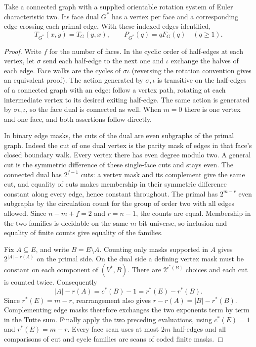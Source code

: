 \begin{theorem}\leavevmode\label{fl:tuttedual}
Take a connected graph with a supplied orientable rotation system of
Euler characteristic two. Its face dual $G^*$ has a vertex per face
and a corresponding edge crossing each primal edge. With these indexed
edges identified,
\[
 T_{G^*}(x,y)=T_G(y,x),\qquad
 P_{G^*}(q)=q F_G(q)\quad(q\ge1).
\]
\end{theorem}
\begin{proof}
Write $f$ for the number of faces. In the cyclic order of half-edges at
each vertex, let $\sigma$ send each half-edge to the next one and
$\iota$ exchange the halves of each edge. Face walks are the cycles of
$\sigma\iota$ (reversing the rotation convention gives an equivalent
proof). The action generated by $\sigma,\iota$ is transitive on the
half-edges of a connected graph with an edge: follow a vertex path,
rotating at each intermediate vertex to its desired exiting half-edge.
The same action is generated by $\sigma\iota,\iota$, so the face dual
is connected as well. When $m=0$ there is one vertex and one face,
and both assertions follow directly.

In binary edge masks, the cuts of the dual are even subgraphs of the
primal graph. Indeed the cut of one dual vertex is the parity mask of
edges in that face's closed boundary walk. Every vertex there has even
degree modulo two. A general cut is the symmetric difference of these
single-face cuts and stays even. The connected dual has $2^{f-1}$ cuts:
a vertex mask and its complement give the same cut, and equality of
cuts makes membership in their symmetric difference constant along
every edge, hence constant throughout. The primal has $2^{m-r}$ even
subgraphs by the circulation count for the group of order two with
all edges allowed. Since $n-m+f=2$ and $r=n-1$, the counts are equal.
Membership in the two families is decidable on the same $m$-bit
universe, so inclusion and equality of finite counts give equality
of the families.

Fix $A\subseteq E$, and write $B=E\setminus A$. Counting only masks
supported in $A$ gives $2^{|A|-r(A)}$ on the primal side. On the dual
side a defining vertex mask must be constant on each component of
$(V^*,B)$. There are $2^{c^*(B)}$ choices and each cut is counted twice.
Consequently
\[
 |A|-r(A)=c^*(B)-1=r^*(E)-r^*(B).
\]
Since $r^*(E)=m-r$, rearrangement also gives
$r-r(A)=|B|-r^*(B)$. Complementing edge masks therefore exchanges
the two exponents term by term in the Tutte sum. Finally apply the two
preceding evaluations, using $c^*(E)=1$ and $r^*(E)=m-r$. Every face
scan uses at most $2m$ half-edges and all comparisons of cut and cycle
families are scans of coded finite masks.
\end{proof}

